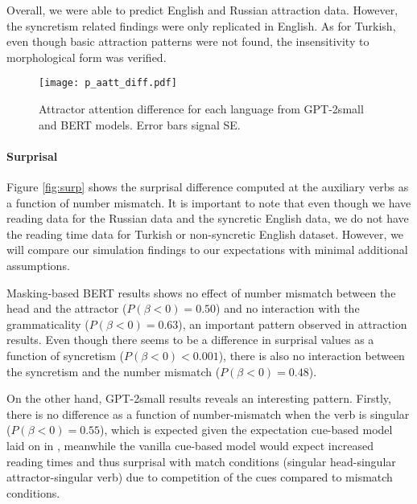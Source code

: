 \documentclass[10pt,letterpaper]{article}
\begin{document}
Overall, we were able to predict English and Russian attraction data. However, the syncretism related findings were only replicated in English. As for Turkish, even though basic attraction patterns were not found, the insensitivity to morphological form was verified. 

\begin{figure}[htb!]
    \centering
    \vspace*{-1em}\texttt{[image: p\_aatt\_diff.pdf]}
    \vspace*{-2em}\caption{Attractor attention difference for each language from GPT-2small and BERT models. Error bars signal SE.}
    \label{fig:att-att}
\end{figure}


\vspace{-2em}
\paragraph{Surprisal}

Figure \ref{fig:surp} shows the surprisal difference computed at the auxiliary verbs as a function of number mismatch. It is important to note that even though we have reading data for the Russian data and the syncretic English data, we do not have the reading time data for Turkish or non-syncretic English dataset. However, we will compare our simulation findings to our expectations with minimal additional assumptions. 

Masking-based BERT results shows no effect of number mismatch between the head and the attractor ($P(\beta < 0) = 0.50$) and no interaction with the grammaticality ($P(\beta < 0) = 0.63$), an important pattern observed in  attraction results. Even though there seems to be a difference in surprisal values as a function of syncretism ($P(\beta < 0) < 0.001$), there is also no interaction between the syncretism and the number mismatch ($P(\beta < 0) = 0.48$). 

On the other hand, GPT-2small results reveals an interesting pattern. Firstly, there is no difference as a function of number-mismatch when the verb is singular ($P(\beta < 0) = 0.55$), which is expected given the expectation cue-based model laid on in , meanwhile the vanilla cue-based model would expect increased reading times and thus surprisal with match conditions (singular head-singular attractor-singular verb) due to competition of the cues compared to mismatch conditions.
\end{document}
